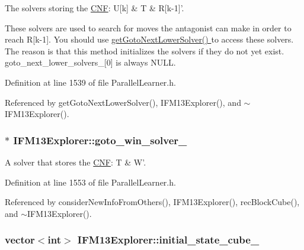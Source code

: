 The solvers storing the \hyperlink{classCNF}{C\-N\-F}\-: U\mbox{[}k\mbox{]} \& T \& R\mbox{[}k-\/1\mbox{]}'. 

These solvers are used to search for moves the antagonist can make in order to reach R\mbox{[}k-\/1\mbox{]}. You should use \hyperlink{classIFM13Explorer_abdf350f2df8a77579df3da7ecb3de8e4}{get\-Goto\-Next\-Lower\-Solver() } to access these solvers. The reason is that this method initializes the solvers if they do not yet exist. goto\-\_\-next\-\_\-lower\-\_\-solvers\-\_\-\mbox{[}0\mbox{]} is always N\-U\-L\-L. 

Definition at line 1539 of file Parallel\-Learner.\-h.



Referenced by get\-Goto\-Next\-Lower\-Solver(), I\-F\-M13\-Explorer(), and $\sim$\-I\-F\-M13\-Explorer().

\hypertarget{classIFM13Explorer_acfe8f5c31b916cf5a6973069c522ef94}{
\subsubsection[{goto\-\_\-win\-\_\-solver\-\_\-}]{$\ast$ I\-F\-M13\-Explorer\-::goto\-\_\-win\-\_\-solver\-\_\-\hspace{0.3cm}{\ttfamily [protected]}}}\label{classIFM13Explorer_acfe8f5c31b916cf5a6973069c522ef94}


A solver that stores the \hyperlink{classCNF}{C\-N\-F}\-: T \& W'. 



Definition at line 1553 of file Parallel\-Learner.\-h.



Referenced by consider\-New\-Info\-From\-Others(), I\-F\-M13\-Explorer(), rec\-Block\-Cube(), and $\sim$\-I\-F\-M13\-Explorer().

\hypertarget{classIFM13Explorer_a8fed8ac3d0dc575f8803878f23df7815}{
\subsubsection[{initial\-\_\-state\-\_\-cube\-\_\-}]{\setlength{\rightskip}{0pt plus 5cm}vector$<$int$>$ I\-F\-M13\-Explorer\-::initial\-\_\-state\-\_\-cube\-\_\-\hspace{0.3cm}{\ttfamily [protected]}}}\label{classIFM13Explorer_a8fed8ac3d0dc575f8803878f23df7815}


